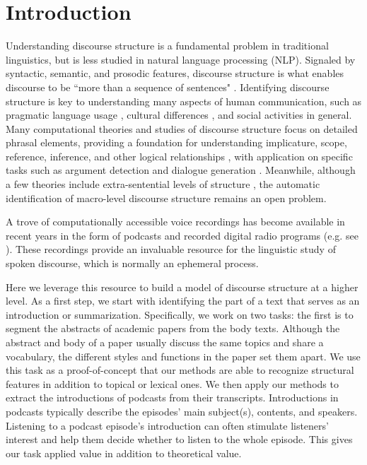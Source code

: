 \section{Introduction} \label{sec:introduction}



Understanding discourse structure is a fundamental problem in traditional linguistics, but is less studied in natural language processing (NLP). Signaled by syntactic, semantic, and prosodic features, discourse structure is what enables discourse to be ``more than a sequence of sentences" \cite{webber2009discourse}. Identifying discourse structure is key to understanding many aspects of human communication, such as pragmatic language usage \cite{redeker1990ideational}, cultural differences \cite{clyne1981culture}, and social activities in general. Many computational theories and studies of discourse structure focus on detailed phrasal elements, providing a foundation for understanding implicature, scope, reference, inference, and other logical relationships \cite{polanyi1996linguistic, grosz1986attention, asher2003logics}, with application on specific tasks such as argument detection \cite{mochales2011argumentation} and dialogue generation \cite{hovy1993automated}. Meanwhile, although a few theories include extra-sentential levels of structure \cite{mann1988rhetorical}, the automatic identification of macro-level discourse structure remains an open problem.

 A trove of computationally accessible voice recordings has become available in recent years in the form of podcasts and recorded digital radio programs (e.g. see \citet{beeferman2019radiotalk}). These recordings provide an invaluable resource for the linguistic study of spoken discourse, which is normally an ephemeral process. 
 
 Here we leverage this resource to build a model of discourse structure at a higher level. As a first step, we start with identifying the part of a text that serves as an introduction or summarization. Specifically, we work on two tasks: the first is to segment the abstracts of academic papers from the body texts. Although the abstract and body of a paper usually discuss the same topics and share a vocabulary, the different styles and functions in the paper set them apart. We use this task as a proof-of-concept that our methods are able to recognize structural features in addition to topical or lexical ones. We then apply our methods to extract the introductions of podcasts from their transcripts. Introductions in podcasts typically describe the episodes' main subject(s), contents, and speakers. Listening to a podcast episode's introduction can often stimulate listeners' interest and help them decide whether to listen to the whole episode. This gives our task applied value in addition to theoretical value.
 
